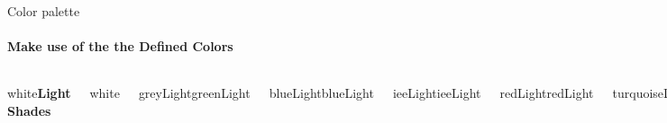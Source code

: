 \documentclass[aspectratio=169]{beamer}
\begin{document}
\begin{frame}{Color palette}
    \framesubtitle{Make use of the the Defined Colors}
    \label{frame:color_palette}
    
    \vspace{1cm}
    \begin{columns}[t]
            \begin{beamercolorbox}[center,colsep*=4pt]{white}\textbf{Light Shades}\strut\end{beamercolorbox}
            \begin{beamercolorbox}[center,colsep*=4pt]{white}\strut\end{beamercolorbox}
            \begin{beamercolorbox}[center,colsep*=4pt]{greyLight}greenLight\strut\end{beamercolorbox}
            \begin{beamercolorbox}[center,colsep*=4pt]{blueLight}blueLight\strut\end{beamercolorbox}
            \begin{beamercolorbox}[center,colsep*=4pt]{ieeLight}ieeLight\strut\end{beamercolorbox}
            \begin{beamercolorbox}[center,colsep*=4pt]{redLight}redLight\strut\end{beamercolorbox}
            \begin{beamercolorbox}[center,colsep*=4pt]{turquoiseLight}turquoiseLight\strut\end{beamercolorbox}
            \begin{beamercolorbox}[center,colsep*=4pt]{greenLight}greenLight\strut\end{beamercolorbox}
            \begin{beamercolorbox}[center,colsep*=4pt]{yellowLight}yellowLight\strut\end{beamercolorbox}
            \begin{beamercolorbox}[center,colsep*=4pt]{white}\textbf{Standard}\strut\end{beamercolorbox}
            \begin{beamercolorbox}[center,colsep*=4pt]{white}\strut\end{beamercolorbox}
            \begin{beamercolorbox}[center,colsep*=4pt]{grey}grey\strut\end{beamercolorbox}
            \begin{beamercolorbox}[center,colsep*=4pt]{blue}blue\strut\end{beamercolorbox}

\end{columns}
\end{frame}
\end{document}
